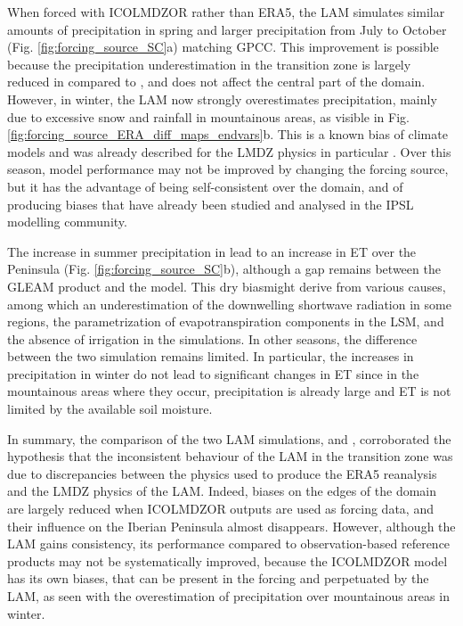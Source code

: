 When forced with ICOLMDZOR rather than ERA5, the LAM simulates similar amounts of precipitation in spring and larger precipitation from July to October (Fig. \ref{fig:forcing_source_SC}a) matching GPCC. This improvement is possible because the precipitation underestimation in the transition zone is largely reduced in \forcingICO compared to \forcingERA, and does not affect the central part of the domain. 
However, in winter, the LAM now strongly overestimates precipitation, mainly due to excessive snow and rainfall in mountainous areas, as visible in Fig. \ref{fig:forcing_source_ERA_diff_maps_endvars}b. This is a known bias of climate models and was already described for the LMDZ physics in particular \citep{arjdal_modeling_2024, adhikari_evaluation_2024}. 
Over this season, model performance may not be improved by changing the forcing source, but it has the advantage of being self-consistent over the domain, and of producing biases that have already been studied and analysed in the IPSL modelling community.

The increase in summer precipitation in \forcingICO lead to an increase in ET over the Peninsula (Fig. \ref{fig:forcing_source_SC}b), although a gap remains between the GLEAM product and the model. This dry biasmight derive from various causes, among which an underestimation of the downwelling shortwave radiation in some regions, the parametrization of evapotranspiration components in the LSM, and the absence of irrigation in the simulations. In other seasons, the difference between the two simulation remains limited. In particular, the increases in precipitation in winter do not lead to significant changes in ET since in the mountainous areas where they occur, precipitation is already large and ET is not limited by the available soil moisture.

\hfill

In summary, the comparison of the two LAM simulations, \forcingERA and \forcingICO, corroborated the hypothesis that the inconsistent behaviour of the LAM in the transition zone was due to discrepancies between the physics used to produce the ERA5 reanalysis and the LMDZ physics of the LAM. Indeed, biases on the edges of the domain are largely reduced when ICOLMDZOR outputs are used as forcing data, and their influence on the Iberian Peninsula almost disappears. However, although the LAM gains consistency, its performance compared to observation-based reference products may not be systematically improved, because the ICOLMDZOR model has its own biases, that can be present in the forcing and perpetuated by the LAM, as seen with the overestimation of precipitation over mountainous areas in winter.

